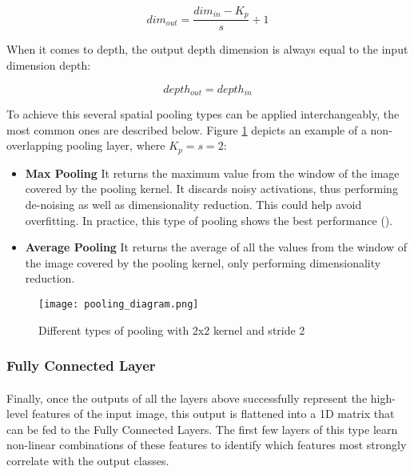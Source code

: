 \begin{equation}
    \label{pool_dim_eq}
    dim_{out} = \frac{dim_{in} - K_p}{s} + 1
\end{equation}

When it comes to depth, the output depth dimension is always equal to the input dimension depth:

\begin{equation}
    \label{pool_depth_eq}
    depth_{out} = depth_{in}
\end{equation}

To achieve this several spatial pooling types can be applied interchangeably, the most common ones are described below. Figure \ref{fig_pooling} depicts an example of a non-overlapping pooling layer, where $K_p=s=2$:

\begin{itemize}
    \item \textbf{Max Pooling} It returns the maximum value from the window of the image covered by the pooling kernel. It discards noisy activations, thus performing de-noising as well as dimensionality reduction. This could help avoid overfitting. In practice, this type of pooling shows the best performance (\cite{GoodBengCour16}).
    \item \textbf{Average Pooling} It returns the average of all the values from the window of the image covered by the pooling kernel, only performing dimensionality reduction.
\end{itemize}

    \begin{figure}[hbt!]
        \centering
        \texttt{[image: pooling\_diagram.png]}
        \caption{Different types of pooling with 2x2 kernel and stride 2}
        \label{fig_pooling}
    \end{figure}
    

\subsubsection{Fully Connected Layer}
\paragraph{}
Finally, once the outputs of all the layers above successfully represent the high-level features of the input image, this output is flattened into a 1D matrix that can be fed to the Fully Connected Layers. The first few layers of this type learn non-linear combinations of these features to identify which features most strongly correlate with the output classes.

